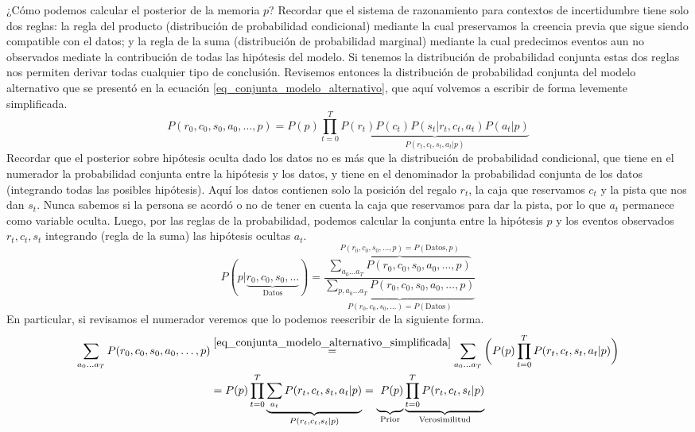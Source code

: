 \documentclass[a4paper,10pt]{article}
\begin{document}
¿Cómo podemos calcular el posterior de la memoria $p$?
%
Recordar que el sistema de razonamiento para contextos de incertidumbre tiene solo dos reglas: la regla del producto (distribución de probabilidad condicional) mediante la cual preservamos la creencia previa que sigue siendo compatible con el datos; y la regla de la suma (distribución de probabilidad marginal) mediante la cual predecimos eventos aun no observados mediate la contribución de todas las hipótesis del modelo.
%
Si tenemos la distribución de probabilidad conjunta estas dos reglas nos permiten derivar todas cualquier tipo de conclusión.
%
Revisemos entonces la distribución de probabilidad conjunta del modelo alternativo que se presentó en la ecuación \ref{eq_conjunta_modelo_alternativo}, que aquí volvemos a escribir de forma levemente simplificada.
%
\begin{equation} \label{eq_conjunta_modelo_alternativo_simplificada}
P(r_0,c_0,s_0,a_0, \dots, p) = P(p)\prod_{t=0}^T \underbrace{P(r_t) P(c_t) P(s_t|r_t,c_t,a_t) P(a_t|p)}_{P(r_t,c_t,s_t,a_t|p)}
\end{equation}
%
Recordar que el posterior sobre hipótesis oculta dado los datos no es más que la distribución de probabilidad condicional, que tiene en el numerador la probabilidad conjunta entre la hipótesis y los datos, y tiene en el denominador la probabilidad conjunta de los datos (integrando todas las posibles hipótesis).
%
Aquí los datos contienen solo la posición del regalo $r_t$, la caja que reservamos $c_t$ y la pista que nos dan $s_t$.
%
Nunca sabemos si la persona se acordó o no de tener en cuenta la caja que reservamos para dar la pista, por lo que $a_t$ permanece como variable oculta.
%
Luego, por las reglas de la probabilidad, podemos calcular la conjunta entre la hipótesis $p$ y los eventos observados $r_t, c_t, s_t$ integrando (regla de la suma) las hipótesis ocultas $a_t$.
%
\begin{equation}
P(p|\underbrace{r_0, c_0, s_0, \dots}_{\text{Datos}} ) = \frac{\overbrace{\sum_{a_0 \dots a_T} P(r_0,c_0,s_0,a_0, \dots, p)}^{P(r_0,c_0,s_0, \dots,p)  = P(\text{Datos}, p)}}{\underbrace{\sum_{p, a_0 \dots a_T} P(r_0,c_0,s_0,a_0, \dots, p)}_{P(r_0,c_0,s_0, \dots) = P(\text{Datos})} }
\end{equation}
%
En particular, si revisamos el numerador veremos que lo podemos reescribir de la siguiente forma.
%
\begin{equation}
\begin{split}
\sum_{a_0 \dots a_T} P(r_0,c_0,s_0,a_0, \dots, p) & \overset{\ref{eq_conjunta_modelo_alternativo_simplificada}}{=} \sum_{a_0 \dots a_T} \bigg(P(p) \prod_{t=0}^{T} P(r_t,c_t,s_t,a_t|p)\bigg) \\
& = P(p) \prod_{t=0}^{T} \underbrace{\sum_{a_t} P(r_t,c_t,s_t,a_t|p)}_{P(r_t,c_t,s_t|p)} = \underbrace{\phantom{\Bigg|}P(p)}_{\text{Prior}} \underbrace{\prod_{t=0}^{T} P(r_t,c_t,s_t|p)}_{\text{Verosimilitud}}
\end{split}
\end{equation}
\end{document}
